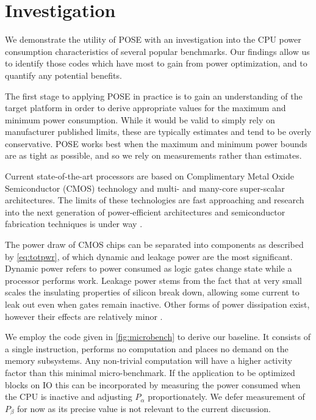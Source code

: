 \section{Investigation}
\label{sec:investigation}


We demonstrate the utility of POSE with an investigation into the CPU power consumption characteristics of several popular benchmarks.
Our findings allow us to identify those codes which have most to gain from power optimization, and to quantify any potential benefits.

The first stage to applying POSE in practice is to gain an understanding of the target platform in order to derive appropriate values for the maximum and minimum power consumption.
While it would be valid to simply rely on manufacturer published limits, these are typically estimates and tend to be overly conservative.
POSE works best when the maximum and minimum power bounds are as tight as possible, and so we rely on measurements rather than estimates.

Current state-of-the-art processors are based on Complimentary Metal Oxide Semiconductor (CMOS) technology and multi- and many-core super-scalar architectures.
The limits of these technologies are fast approaching and research into the next generation of power-efficient architectures and semiconductor fabrication techniques is under way \cite{esmaeilzadeh:2011aa}.

The power draw of CMOS chips can be separated into components as described by \autoref{eq:totpwr}, of which dynamic and leakage power are the most significant.
Dynamic power refers to power consumed as logic gates change state while a processor performs work. 
Leakage power stems from the fact that at very small scales the insulating properties of silicon break down, allowing some current to leak out even when gates remain inactive.
Other forms of power dissipation exist, however their effects are relatively minor \cite{kaxiras:2008aa}.




We employ the code given in \autoref{fig:microbench} to derive our baseline.  It consists of a single instruction, performs no computation and places no demand on the memory subsystems. Any non-trivial computation will have a higher activity factor than this minimal micro-benchmark. If the application to be optimized blocks on IO this can be incorporated by measuring the power consumed when the CPU is inactive and adjusting $P_\alpha$ proportionately. We defer measurement of $P_{\beta}$ for now as its precise value is not relevant to the current discussion. 

